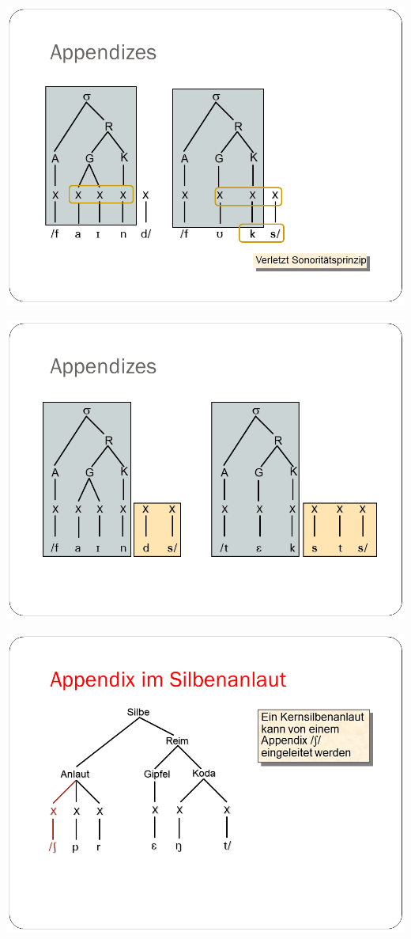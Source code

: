 \documentclass[
  letterpaper,
]{scrbook}
\begin{document}
\includegraphics[width=1\textwidth,height=\textheight]{./pictures/Wagner_Maas_Duden_Petric_27.PNG}

\includegraphics[width=1\textwidth,height=\textheight]{./pictures/Wagner_Maas_Duden_Petric_28.PNG}

\includegraphics[width=1\textwidth,height=\textheight]{./pictures/Wagner_Maas_Duden_Petric_29.PNG}
\end{document}
